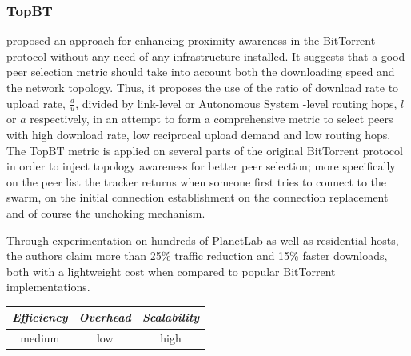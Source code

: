 \subsubsection{TopBT}
\cite{RTLCGZ2010} proposed an approach for enhancing proximity awareness
in the BitTorrent protocol without any need of any infrastructure installed. It
suggests that a good peer selection metric should take into account both the
downloading speed and the network topology. Thus, it proposes the use of the
ratio of download rate to upload rate, $\frac{d}{u}$, divided by link-level or
Autonomous System -level routing hops, $l$ or $a$ respectively, in an attempt to
form a comprehensive metric to select peers with high download rate, low
reciprocal upload demand and low routing hops. The TopBT metric is applied on
several parts of the original BitTorrent protocol in order to inject topology
awareness for better peer selection; more specifically on the peer list the
tracker returns when someone first tries to connect to the swarm, on the initial
connection establishment on the connection replacement and of course the
unchoking mechanism.


Through experimentation on hundreds of PlanetLab as well as residential hosts,
the authors claim more than 25\% traffic reduction and 15\% faster downloads,
both with a lightweight cost when compared to popular BitTorrent
implementations.

\begin{center}
\begin{tabular}{ccc}
\emph{Efficiency} & \emph{Overhead} & \emph{Scalability} \\
\hline
medium &
low &
high
\end{tabular}
\end{center}

